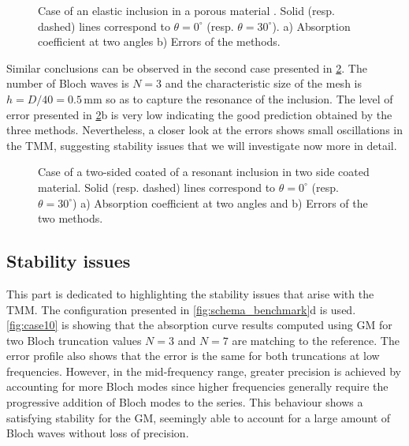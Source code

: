 \begin{figure}[hbtp]
\centering
{}
\caption{Case of an elastic inclusion in a porous material \cite{weisser2016}. Solid (resp. dashed) lines correspond to $\theta=0^\circ$ (resp. $\theta=30^\circ$).  a) Absorption coefficient at two angles b) Errors of the methods.\label{fig:case1}}
\end{figure}

Similar conclusions can be observed in the second case presented in \cref{fig:case13}. The number of Bloch waves is $N=3$ and the characteristic size of the mesh is $h=D/40=0.5\, \mathrm{mm}$ so as to capture the resonance of the inclusion. The level of error presented in \cref{fig:case13}b is very low indicating the good prediction obtained by the three methods. Nevertheless, a closer look at the errors shows small oscillations in the TMM, suggesting stability issues that we will investigate now more in detail.


\begin{figure}[htpb]
\centering
{}
\caption{Case of a two-sided coated of a resonant inclusion in two side coated  material. Solid (resp. dashed) lines correspond to $\theta=0^\circ$ (resp. $\theta=30^\circ$) a) Absorption coefficient at two angles and b) Errors of the two methods. \label{fig:case13}}
\end{figure}

\subsection{Stability issues}
This part is dedicated to highlighting the stability issues that arise with the TMM. The configuration presented in \cref{fig:schema_benchmark}d is used. \cref{fig:case10} is showing that the absorption curve results computed using GM for two Bloch truncation values $N=3$ and $N=7$ are matching to the reference. The error profile also shows that the error is the same for both truncations at low frequencies. However, in the mid-frequency range, greater precision is achieved by accounting for more Bloch modes since higher frequencies generally require the progressive addition of Bloch modes to the series. This behaviour shows a satisfying stability for the GM, seemingly able to account for a large amount of Bloch waves without loss of precision. 

